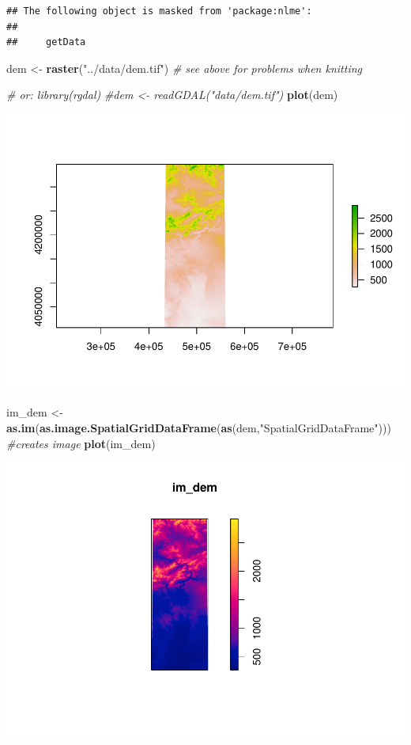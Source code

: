 \documentclass[]{article}
\newenvironment{Shaded}{\begin{snugshade}}{\end{snugshade}}
\newcommand{\KeywordTok}[1]{\textcolor[rgb]{0.13,0.29,0.53}{\textbf{{#1}}}}
\newcommand{\StringTok}[1]{\textcolor[rgb]{0.31,0.60,0.02}{{#1}}}
\newcommand{\CommentTok}[1]{\textcolor[rgb]{0.56,0.35,0.01}{\textit{{#1}}}}
\newcommand{\NormalTok}[1]{{#1}}
\begin{document}
\begin{verbatim}
## The following object is masked from 'package:nlme':
## 
##     getData
\end{verbatim}

\begin{Shaded}
\begin{Highlighting}[]
\NormalTok{dem <-}\StringTok{ }\KeywordTok{raster}\NormalTok{(}\StringTok{"../data/dem.tif"}\NormalTok{) }\CommentTok{# see above for problems when knitting}

\CommentTok{# or: library(rgdal)}
\CommentTok{#dem <- readGDAL("data/dem.tif")}
\KeywordTok{plot}\NormalTok{(dem)}
\end{Highlighting}
\end{Shaded}

\includegraphics{HarranPlain_files/figure-latex/unnamed-chunk-6-1.pdf}

\begin{Shaded}
\begin{Highlighting}[]
\NormalTok{im_dem <-}\StringTok{ }\KeywordTok{as.im}\NormalTok{(}\KeywordTok{as.image.SpatialGridDataFrame}\NormalTok{(}\KeywordTok{as}\NormalTok{(dem,}\StringTok{"SpatialGridDataFrame"}\NormalTok{))) }\CommentTok{#creates image}
\KeywordTok{plot}\NormalTok{(im_dem)}
\end{Highlighting}
\end{Shaded}

\includegraphics{HarranPlain_files/figure-latex/unnamed-chunk-6-2.pdf}
\end{document}
